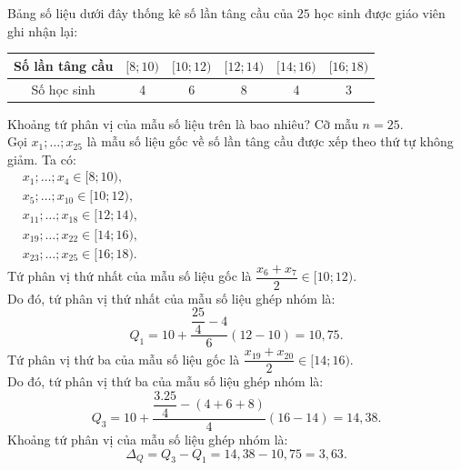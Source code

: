 \begin{bt}%

	Bảng số liệu dưới đây thống kê số lần tâng cầu của $25$ học sinh được giáo viên ghi nhận lại:
	\begin{center}
		\begin{tabular}{|c|c|c|c|c|c|}
			\hline Số lần tâng cầu & {$[8 ; 10)$} & {$[10 ; 12)$} & {$[12 ; 14)$} & {$[14 ; 16)$} & {$[16 ; 18)$} \\
			\hline Số học sinh & 4 & 6 & 8 & 4 & 3 \\
			\hline
		\end{tabular}
	\end{center}
	Khoảng tứ phân vị của mẫu số liệu trên là bao nhiêu?
	\loigiai
	{
		Cỡ mẫu $n=25$.\\
		Gọi $x_1; \ldots; x_{25}$ là mẫu số liệu gốc về số lần tâng cầu được xếp theo thứ tự không giảm.
		Ta có:\\
		$\begin{aligned}
			& x_1; \ldots; x_4 \in[8; 10), \\
			& x_5; \ldots; x_{10} \in[10; 12), \\
			& x_{11}; \ldots; x_{18} \in[12; 14), \\
			& x_{19}; \ldots; x_{22} \in[14; 16), \\
			& x_{23}; \ldots; x_{25} \in[16; 18).
		\end{aligned}$\\
		Tứ phân vị thứ nhất của mẫu số liệu gốc là $\dfrac{x_6+x_7}{2} \in[10; 12)$.\\ 
		Do đó, tứ phân vị thứ nhất của mẫu số liệu ghép nhóm là: $$Q_1=10+\dfrac{\dfrac{25}{4}-4}{6}(12-10)=10{,}75.$$
		Tứ phân vị thứ ba của mẫu số liệu gốc là $\dfrac{x_{19}+x_{20}}{2} \in[14; 16)$. \\
		Do đó, tứ phân vị thứ ba của mẫu số liệu ghép nhóm là: $$Q_3=10+\dfrac{\dfrac{3.25}{4}-(4+6+8)}{4}(16-14)=14{,}38.$$
		Khoảng tứ phân vị của mẫu số liệu ghép nhóm là: $$\Delta_Q=Q_3-Q_1=14{,}38-10{,}75=3{,}63.$$  	
	}
\end{bt}

